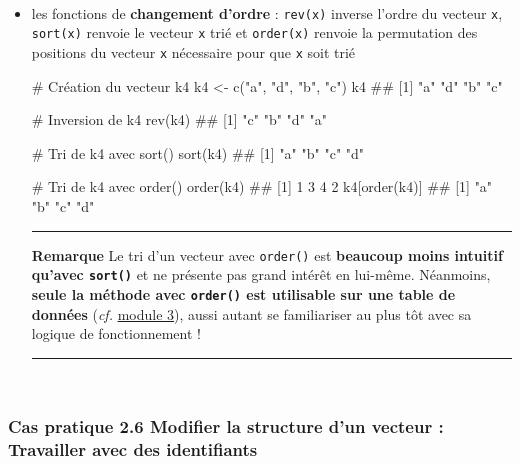 \documentclass[12pt,twosided, notitlepage]{book}
\newenvironment{Shaded}{}{}
\newcommand{\CommentTok}[1]{\textcolor[rgb]{0.00,0.50,0.00}{#1}}
\newcommand{\KeywordTok}[1]{\textcolor[rgb]{0.00,0.00,1.00}{#1}}
\newcommand{\NormalTok}[1]{#1}
\newcommand{\StringTok}[1]{\textcolor[rgb]{0.00,0.50,0.50}{#1}}
\renewenvironment{Shaded}{\begin{snugshade}}{\end{snugshade}}
\begin{document}
~

\begin{itemize}
\item
  les fonctions de \textbf{changement d'ordre} :
  \texttt{rev(x)} inverse l'ordre du vecteur
  \texttt{x}, \texttt{sort(x)} renvoie le
  vecteur \texttt{x} trié et
  \texttt{order(x)} renvoie la permutation
  des positions du vecteur \texttt{x} nécessaire pour que \texttt{x}
  soit trié

\begin{Shaded}
\begin{Highlighting}[]
\CommentTok{# Création du vecteur k4}
\NormalTok{k4 <-}\StringTok{ }\KeywordTok{c}\NormalTok{(}\StringTok{"a"}\NormalTok{, }\StringTok{"d"}\NormalTok{, }\StringTok{"b"}\NormalTok{, }\StringTok{"c"}\NormalTok{)}
\NormalTok{k4}
\NormalTok{  ## [1] "a" "d" "b" "c"}

\CommentTok{# Inversion de k4}
\KeywordTok{rev}\NormalTok{(k4)}
\NormalTok{  ## [1] "c" "b" "d" "a"}

\CommentTok{# Tri de k4 avec sort()}
\KeywordTok{sort}\NormalTok{(k4)}
\NormalTok{  ## [1] "a" "b" "c" "d"}

\CommentTok{# Tri de k4 avec order()}
\KeywordTok{order}\NormalTok{(k4)}
\NormalTok{  ## [1] 1 3 4 2}
\NormalTok{k4[}\KeywordTok{order}\NormalTok{(k4)]}
\NormalTok{  ## [1] "a" "b" "c" "d"}
\end{Highlighting}
\end{Shaded}

  \begin{center}\rule{0.5\linewidth}{\linethickness}\end{center}

  \textbf{Remarque} Le tri d'un vecteur avec \texttt{order()} est
  \textbf{beaucoup moins intuitif qu'avec \texttt{sort()}} et ne
  présente pas grand intérêt en lui-même. Néanmoins, \textbf{seule la
  méthode avec \texttt{order()} est utilisable sur une table de données}
  (\emph{cf.} \underline{module 3}), aussi autant se familiariser au
  plus tôt avec sa logique de fonctionnement !

  \begin{center}\rule{0.5\linewidth}{\linethickness}\end{center}
\end{itemize}

~

\hypertarget{cas-pratique-2.6-modifier-la-structure-dun-vecteur-travailler-avec-des-identifiants}{%
\subsubsection{\texorpdfstring{\textbf{Cas pratique 2.6} Modifier la
structure d'un vecteur : Travailler avec des
identifiants}{Cas pratique 2.6 Modifier la structure d'un vecteur : Travailler avec des identifiants}}\label{cas-pratique-2.6-modifier-la-structure-dun-vecteur-travailler-avec-des-identifiants}}
\end{document}
